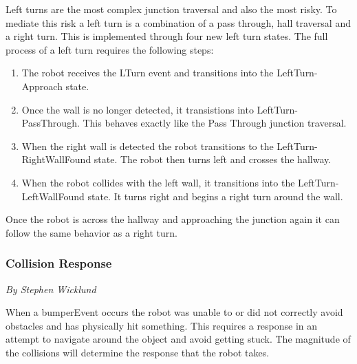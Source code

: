 \documentclass[12pt]{report}
\newcommand{\sectionAuthor}[1]{{\small\vspace{-1em}\textit{#1}}\bigskip\par}
\begin{document}
Left turns are the most complex junction traversal and also the most risky. To mediate this risk a left turn is a combination of a pass through, hall traversal and a right turn. This is implemented through four new left turn states. The full process of a left turn requires the following steps:
\begin{enumerate}
    \item The robot receives the LTurn event and transitions into the LeftTurn-Approach state.
    \item Once the wall is no longer detected, it transistions into LeftTurn-PassThrough. This behaves exactly like the Pass Through junction traversal.
    \item When the right wall is detected the robot transitions to the LeftTurn-RightWallFound state. The robot then turns left and crosses the hallway.
    \item When the robot collides with the left wall, it transitions into the LeftTurn-LeftWallFound state. It turns right and begins a right turn around the wall.
\end{enumerate}

Once the robot is across the hallway and approaching the junction again it can follow the same behavior as a right turn.

\subsubsection{Collision Response} \label{Collision Reponse}
\sectionAuthor{By Stephen Wicklund}
When a bumperEvent occurs the robot was unable to or did not correctly avoid obstacles and has physically hit something. This requires a response in an attempt to navigate around the object and avoid getting stuck. The magnitude of the collisions will determine the response that the robot takes.
\end{document}
